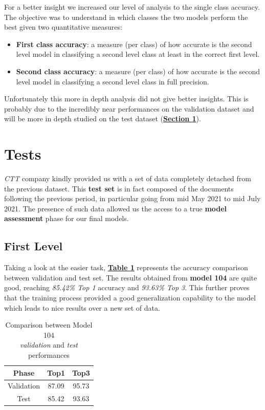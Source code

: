 \documentclass[12pt]{article}
\begin{document}
For a better insight we increased our level of analysis to the single class accuracy. The objective was to understand in which classes the two models perform the best given two quantitative measures:
\begin{itemize}
    \item \textbf{First class accuracy}: a measure (per class) of how accurate is the second level model in classifying a second level class at least in the correct first level.
    \item \textbf{Second class accuracy}: a measure (per class) of how accurate is the second level model in classifying a second level class in full precision.
\end{itemize}
Unfortunately this more in depth analysis did not give better insights. This is probably due to the incredibly near performances on the validation dataset and will be more in depth studied on the test dataset (\hyperref[sec:test]{\textbf{Section \ref{sec:test}}}).

\section{Tests}\label{sec:test}
\textit{CTT} company kindly provided us with a set of data completely detached from the previous dataset. This \textbf{test set} is in fact composed of the documents following the previous period, in particular going from mid May 2021 to mid July 2021. The presence of such data allowed us the access to a true \textbf{model assessment} phase for our final models.

\subsection{First Level}
Taking a look at the easier task, \hyperref[tb:firsttest]{\textbf{Table \ref{tb:firsttest}}} represents the accuracy comparison between validation and test set. The results obtained from \textbf{model 104} are quite good, reaching \textit{85.42\% Top 1} accuracy and \textit{93.63\% Top 3}. This further proves that the training process provided a good generalization capability to the model which leads to nice results over a new set of data.
\begin{table}[ht!]
    \begin{adjustwidth}{}{}
	    \centering
	    \small
	    \begin{tabular}{ |c|c|c| }
        \hline
        \textbf{Phase} & \textbf{Top1} & \textbf{Top3}\\
        \hline
        Validation & 87.09 & 95.73\\
        Test & 85.42 & 93.63\\
        \hline
        \end{tabular}
    \end{adjustwidth}
    \captionsetup{justification   = centering}
    \caption{Comparison between Model 104 \\\textit{validation} and \textit{test} performances}
    \label{tb:firsttest}
\end{table}
\end{document}
